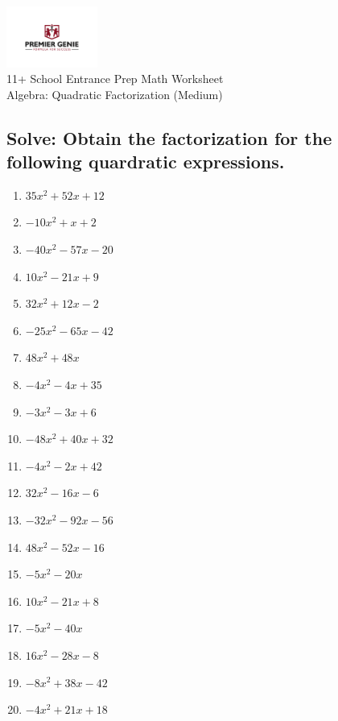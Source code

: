 \documentclass{article}
\begin{document}
\begin{center}
\includegraphics[width=3cm]{PREMGENIEJPG.jpg}\\
{\Large 11+ School Entrance Prep Math Worksheet}\\
{\Medium Algebra: Quadratic Factorization (Medium)}\\

\end{center}

\subsection*{Solve: Obtain the factorization for the following quardratic expressions.}

\begin{enumerate}
\item $\displaystyle 35 x^{2} + 52 x + 12 $ \ 
\item $\displaystyle - 10 x^{2} + x + 2 $ \ 
\item $\displaystyle - 40 x^{2} - 57 x - 20 $ \ 
\item $\displaystyle 10 x^{2} - 21 x + 9 $ \ 
\item $\displaystyle 32 x^{2} + 12 x - 2 $ \ 
\item $\displaystyle - 25 x^{2} - 65 x - 42 $ \ 
\item $\displaystyle 48 x^{2} + 48 x $ \ 
\item $\displaystyle - 4 x^{2} - 4 x + 35 $ \ 
\item $\displaystyle - 3 x^{2} - 3 x + 6 $ \ 
\item $\displaystyle - 48 x^{2} + 40 x + 32 $ \ 
\item $\displaystyle - 4 x^{2} - 2 x + 42 $ \ 
\item $\displaystyle 32 x^{2} - 16 x - 6 $ \ 
\item $\displaystyle - 32 x^{2} - 92 x - 56 $ \ 
\item $\displaystyle 48 x^{2} - 52 x - 16 $ \ 
\item $\displaystyle - 5 x^{2} - 20 x $ \ 
\item $\displaystyle 10 x^{2} - 21 x + 8 $ \ 
\item $\displaystyle - 5 x^{2} - 40 x $ \ 
\item $\displaystyle 16 x^{2} - 28 x - 8 $ \ 
\item $\displaystyle - 8 x^{2} + 38 x - 42 $ \ 
\item $\displaystyle - 4 x^{2} + 21 x + 18 $ \ 


\end{enumerate}
\end{document}

